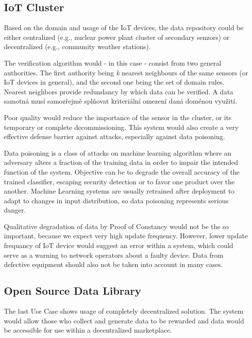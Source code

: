 \subsection{IoT Cluster}

Based on the domain and usage of the IoT devices, the data repository could be either centralized (e.g., nuclear power plant cluster of secondary senzors) or decentralized (e.g., community weather stations).

The verification algorithm would - in this case - consist from two general authorities.
The first authority being \textit{k} nearest neighbours of the same sensors (or IoT devices in general), and the second one being the set of domain rules.
Nearest neighbors provide redundancy by which data can be verified.
A data samotná musí samozřejmě splňovat kriteriální omezení daná doménou využití.

Poor quality would reduce the importance of the sensor in the cluster, or its temporary or complete decommissioning.
This system would also create a very effective defense barrier against attacks, especially against data poisoning.

Data poisoning is a class of attacks on machine learning algorithm where an adversary alters a fraction of the training data in order to impair the intended function of the system.
Objective can be to degrade the overall accuracy of the trained classifier, escaping security detection or to favor one product over the another.
Machine Learning systems are usually retrained after deployment to adapt to changes in input distribution, so data poisoning represents serious danger.

Qualitative degradation of data by Proof of Constancy would not be the so important, because we expect very high update frequency.
However, lower update frequancy of IoT device would suggest an error within a system, which could serve as a warning to network operators about a faulty device.
Data from defective equipment should also not be taken into account in many cases.

\subsection{Open Source Data Library}

The last Use Case shows usage of completely decentralized solution.
The system would allow those who collect and generate data to be rewarded and data would be accessible for use within a decentralized marketplace.

